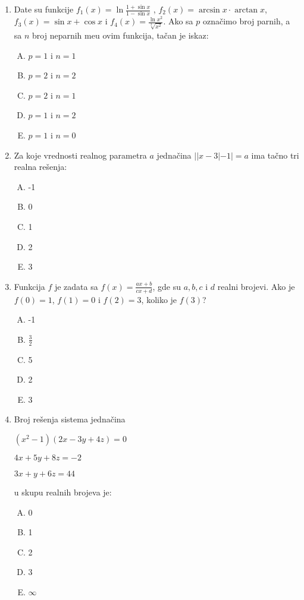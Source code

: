 \documentclass[a4paper,12pt]{report}
\begin{document}
\begin{enumerate}[1.]
\item Date su funkcije  $ f_1(x) = \ln \frac{1 + \sin{x}}{1 - \sin{x}}$ , $ f_2(x) = \arcsin{x} \cdot \arctan{x} $, $ f_3(x) = \sin{x} + \cos{x} $ i $f_4(x) = \frac{\ln{x^2}}{\sqrt[3]{x^2}} $. Ako sa $p$ ozna\v{c}imo broj parnih, a sa $n$ broj neparnih me\dj{}u ovim funkcija, ta\v{c}an je iskaz:
\begin{multicols}{3}
\begin{enumerate}[A)]
\item $p = 1$ i $n = 1$ \item $p = 2$ i $n = 2$ \item $p = 2$ i $n = 1$ \item $p = 1$ i $n = 2$ \item $p = 1$ i $n = 0$
\end{enumerate}
\end{multicols}



\item Za koje vrednosti realnog parametra $a$ jedna\v{c}ina $||x-3|-1|=a$ ima ta\v{c}no tri realna re\v{s}enja:
\begin{multicols}{5}
\begin{enumerate}[A)]
\item -1 \item 0 \item 1 \item 2 \item 3
\end{enumerate}
\end{multicols}


\item Funkcija $f$ je zadata sa $f(x) = \frac{ax +b}{cx+d} $, gde su $a,b,c$ i $d$ realni brojevi. Ako je $f(0) = 1$,  $f(1) = 0$ i  $f(2) = 3$, koliko je  $f(3)$?
\begin{multicols}{5}
\begin{enumerate}[A)]
\item -1 \item $\frac{3}{2}$ \item 5 \item 2 \item 3
\end{enumerate}
\end{multicols}


\item Broj re\v{s}enja sistema jedna\v{c}ina 
\par $(x^{2} - 1)(2x -3y + 4z) = 0$
\par $4x + 5y +8z = -2$
\par $3x + y + 6z = 44$
\par u skupu realnih brojeva je: 
\begin{multicols}{5}
\begin{enumerate}[A)]
\item 0 \item 1 \item 2 \item 3 \item $\infty$
\end{enumerate}
\end{multicols}


\end{enumerate}
\end{document}
